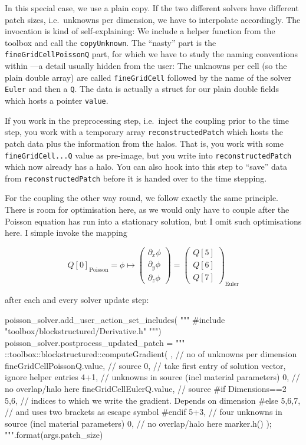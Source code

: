 \noindent
In this special case, we use a plain copy. 
If the two different solvers have different patch sizes, i.e.~unknowns per
dimension, we have to interpolate accordingly.
The invocation is kind of self-explaining: 
We include a helper function from the toolbox and call the \texttt{copyUnknown}.
The ``nasty'' part is the \texttt{fineGridCellPoissonQ} part, for which we have
to study the naming conventions within \ExaHyPE---a detail usually hidden from
the user:
The unknowns per cell (so the plain double array) are called
\texttt{fineGridCell} followed by the name of the solver \texttt{Euler} and then
a \texttt{Q}.
The data is actually a struct for our plain double fields which hosts a pointer
\texttt{value}.


\begin{remark}
 If you work in the preprocessing step, i.e.~inject the coupling prior to the
 time step, you work with a temporary array \texttt{reconstructedPatch} which
 hosts the patch data plus the information from the halos.
 That is, you work with some \texttt{fineGridCell...Q} value as pre-image, but
 you write into \texttt{reconstructedPatch} which now already has a halo. 
 You can also hook into this step to ``save'' data from
 \texttt{reconstructedPatch} before it is handed over to the time stepping.
\end{remark}


\noindent
For the coupling the other way round, we follow exactly the same principle.
There is room for optimisation here, as we would only have to couple after the 
Poisson equation has run into a stationary solution, but I omit such
optimisations here.
I simple invoke the mapping

\[
 Q[0] _{\text{Poisson}} = 
 \phi \mapsto \left(
  \begin{array}{c}
\partial _x \phi \\
\partial _y \phi \\
\partial _z \phi 
  \end{array} 
 \right)
 = \left(
  \begin{array}{c}
Q[5] \\
Q[6] \\
Q[7]
  \end{array} 
 \right)_{\text{Euler}}
\]

\noindent
after each and every solver update step:

\begin{code}
poisson_solver.add_user_action_set_includes( """
#include "toolbox/blockstructured/Derivative.h"
""")
poisson_solver.postprocess_updated_patch = """
 ::toolbox::blockstructured::computeGradient(
   {},      // no of unknowns per dimension
   fineGridCellPoissonQ.value, // source
   0,       // take first entry of solution vector, ignore helper entries
   4+1,     // unknowns in source (incl material parameters)
   0,       // no overlap/halo here
   fineGridCellEulerQ.value, // source
   #if Dimensions==2
   {{5,6}},   // indices to which we write the gradient. Depends on dimension
   #else
   {{5,6,7}}, // and uses two brackets as escape symbol
   #endif
   5+3,     // four unknowns in source (incl material parameters)
   0,       // no overlap/halo here
   marker.h()
 );
""".format(args.patch_size)
\end{code}


